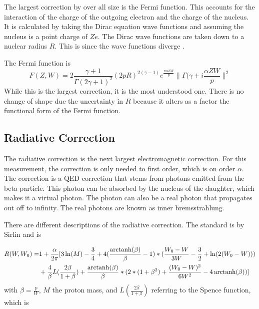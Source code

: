 \documentclass[../MaxHughesThesis.tex]{subfiles}
\begin{document}
The largest correction by over all size is the Fermi function.
This accounts for the interaction of the charge of the outgoing electron and the charge of the nucleus.
It is calculated by taking the Dirac equation wave functions and assuming the nucleus is a point charge of $Ze$.
The Dirac wave functions are taken down to a nuclear radius $R$.
This is since the wave functions diverge \cite{Wil89}.

The Fermi function is %
\begin{equation}
	F(Z,W) = 2\frac{\gamma + 1}{\Gamma(2\gamma +1)^{2}}(2pR)^{2(\gamma - 1)}e^{\frac{\pi\alpha ZW}{p}}\|\Gamma(\gamma + i\frac{\alpha ZW}{p}\|^{2}
	\label{eq:fermifunc}
\end{equation}
While this is the largest correction, it is the most understood one.
There is no change of shape due the uncertainty in $R$ because it alters as a factor the functional form of the Fermi function. 

\subsection{Radiative Correction}
The radiative correction is the next largest electromagnetic correction.
For this measurement, the correction is only needed to first order, which is on order $\alpha$.
The correction is a QED correction that stems from photons emitted from the beta particle.
This photon can be absorbed by the nucleus of the daughter, which makes it a virtual photon.
The photon can also be a real photon that propagates out off to infinity.
The real photons are known as inner bremsstrahlung.

There are different descriptions of the radiative correction.  
The standard is by Sirlin \cite{Sir67} and is %

\begin{equation}
	\label{eq:sirlinrad}
	\begin{split}
	R(W,W_{0}) = & 1 + \frac{\alpha}{2\pi}[3\ln(M) - \frac{3}{4} + 4(\frac{\operatorname{arctanh}(\beta)}{\beta} - 1)*(\frac{W_{0} - W}{3W} - \frac{3}{2} + \ln(2(W_{0} - W))) \\
	 & + \frac{4}{\beta}L(\frac{2\beta}{1 + \beta}) + \frac{\operatorname{arctanh}(\beta)}{\beta}*(2*(1 + \beta^{2}) + \frac{(W_{0} - W)^{2}}{6W^{2}} - 4 \operatorname{arctanh}(\beta))]
	\end{split}
\end{equation} 
with $\beta = \frac{p}{W}$, $M$ the proton mass, and $L(\frac{2\beta}{1+\beta})$ referring to the Spence function, which is \cite{Wil95} %
\end{document}
